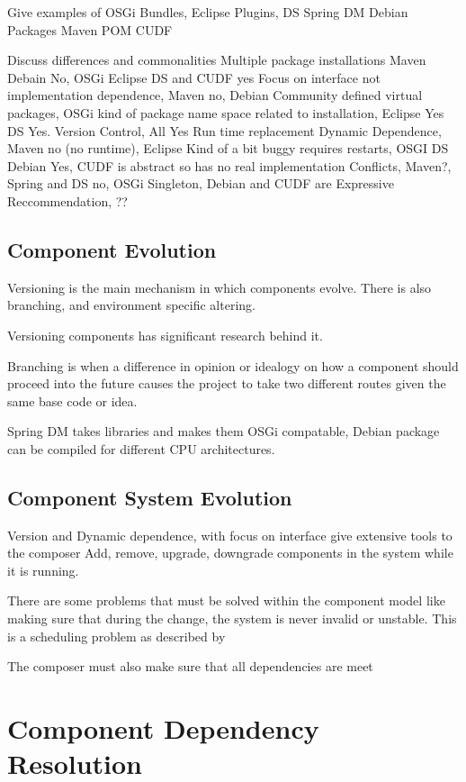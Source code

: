 \documentclass{report}
\begin{document}
Give examples of OSGi Bundles, Eclipse Plugins, DS
Spring DM
Debian Packages
Maven POM
CUDF

Discuss differences and commonalities
Multiple package installations Maven Debain No, OSGi Eclipse DS and CUDF yes
Focus on interface not implementation dependence, Maven no, Debian Community defined virtual packages, 
OSGi kind of package name space related to installation, Eclipse Yes DS Yes.
Version Control, All Yes
Run time replacement Dynamic Dependence, Maven no (no runtime), Eclipse Kind of a bit buggy requires restarts,
OSGI DS Debian Yes, CUDF is abstract so has no real implementation
Conflicts, Maven?, Spring and DS no,  OSGi Singleton, Debian and CUDF are Expressive
Reccommendation, ??

\section{Component Evolution}
Versioning is the main mechanism in which components evolve.
There is also branching, and environment specific altering.

Versioning components has significant research behind it.

Branching is when a difference in opinion or idealogy on how a component should proceed into the future
causes the project to take two different routes given the same base code or idea.

Spring DM takes libraries and makes them OSGi compatable, 
Debian package can be compiled for different CPU architectures.


\section{Component System Evolution}
Version and Dynamic dependence, with focus on interface give extensive tools to the composer 
Add, remove, upgrade, downgrade components in the system while it is running.

There are some problems that must be solved within the component model like making sure that during the change,
the system is never invalid or unstable. 
This is a scheduling problem as described by %

The composer must also make sure that all dependencies are meet 



\chapter{Component Dependency Resolution}
\end{document}
